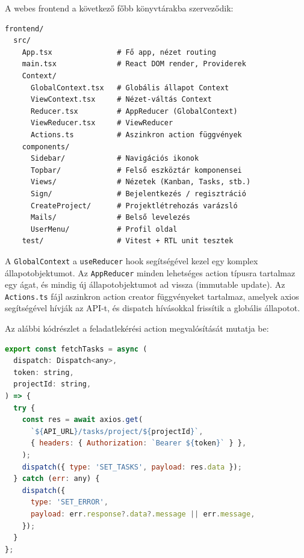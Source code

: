 


A webes frontend a következő főbb könyvtárakba szerveződik:

\begin{lstlisting}[caption={Webes frontend könyvtárstruktúra}]
frontend/
  src/
    App.tsx               # Fő app, nézet routing
    main.tsx              # React DOM render, Providerek
    Context/
      GlobalContext.tsx   # Globális állapot Context
      ViewContext.tsx     # Nézet-váltás Context
      Reducer.tsx         # AppReducer (GlobalContext)
      ViewReducer.tsx     # ViewReducer
      Actions.ts          # Aszinkron action függvények
    components/
      Sidebar/            # Navigációs ikonok
      Topbar/             # Felső eszköztár komponensei
      Views/              # Nézetek (Kanban, Tasks, stb.)
      Sign/               # Bejelentkezés / regisztráció
      CreateProject/      # Projektlétrehozás varázsló
      Mails/              # Belső levelezés
      UserMenu/           # Profil oldal
    test/                 # Vitest + RTL unit tesztek
\end{lstlisting}


A \texttt{GlobalContext} a \texttt{useReducer} hook segítségével kezel egy komplex állapotobjektumot. Az \texttt{AppReducer} minden lehetséges action típusra tartalmaz egy ágat, és mindig új állapotobjektumot ad vissza (immutable update). Az \texttt{Actions.ts} fájl aszinkron action creator függvényeket tartalmaz, amelyek axios segítségével hívják az API-t, és dispatch hívásokkal frissítik a globális állapotot.

Az alábbi kódrészlet a feladatlekérési action megvalósítását mutatja be:

\begin{lstlisting}[language=JavaScript, caption={fetchTasks action (Context/Actions.ts)}]
export const fetchTasks = async (
  dispatch: Dispatch<any>,
  token: string,
  projectId: string,
) => {
  try {
    const res = await axios.get(
      `${API_URL}/tasks/project/${projectId}`,
      { headers: { Authorization: `Bearer ${token}` } },
    );
    dispatch({ type: 'SET_TASKS', payload: res.data });
  } catch (err: any) {
    dispatch({
      type: 'SET_ERROR',
      payload: err.response?.data?.message || err.message,
    });
  }
};
\end{lstlisting}

